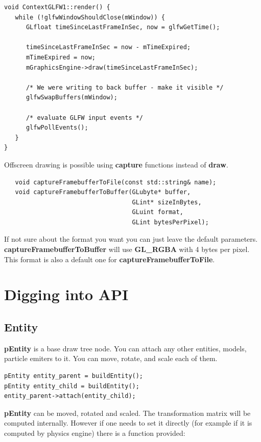 \documentclass{article}
\begin{document}
\begin{lstlisting}
void ContextGLFW1::render() {
   while (!glfwWindowShouldClose(mWindow)) {
      GLfloat timeSinceLastFrameInSec, now = glfwGetTime();

      timeSinceLastFrameInSec = now - mTimeExpired;
      mTimeExpired = now;
      mGraphicsEngine->draw(timeSinceLastFrameInSec);

      /* We were writing to back buffer - make it visible */
      glfwSwapBuffers(mWindow);
      
      /* evaluate GLFW input events */
      glfwPollEvents();
   }
}
\end{lstlisting}

\indent Offscreen drawing is possible using \textbf{capture} functions instead of \textbf{draw}.

\begin{lstlisting}
   void captureFramebufferToFile(const std::string& name);
   void captureFramebufferToBuffer(GLubyte* buffer,
                                   GLint* sizeInBytes,
                                   GLuint format,
                                   GLint bytesPerPixel);
\end{lstlisting}
\indent \indent If not sure about the format you want you can just leave the default parameters. \textbf{captureFramebufferToBuffer} will use \textbf{GL\_RGBA} with 4 bytes per pixel. This format is also a default one for \textbf{captureFramebufferToFile}.

\section{Digging into API}

\subsection{Entity}\label{sec:Entity}
\indent \indent \textbf{pEntity} is a base draw tree node. You can attach any other entities, models, particle emiters to it. You can move, rotate, and scale each of them.

\begin{lstlisting}
pEntity entity_parent = buildEntity();
pEntity entity_child = buildEntity();
entity_parent->attach(entity_child);
\end{lstlisting}

\indent \indent \textbf{pEntity} can be moved, rotated and scaled. The transformation matrix will be computed internally. However if one needs to set it directly (for example if it is computed by physics engine) there is a function provided:
\end{document}
